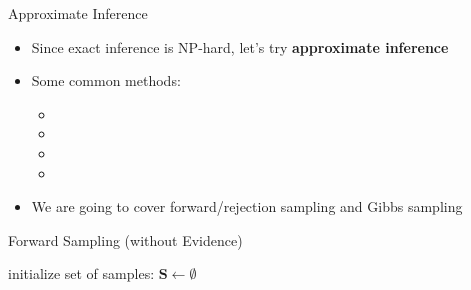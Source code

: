 \begin{frame}{Approximate Inference}{}
	\begin{itemize}
		\item Since exact inference is NP-hard, let's try \textbf{approximate inference}
		\item Some common methods:
		\begin{itemize}
			\item {}
			\item {}
			\item {}
			\item {}
		\end{itemize}
		\item We are going to cover forward/rejection sampling and Gibbs sampling
	\end{itemize}
\end{frame}


\begin{frame}{Forward Sampling (without Evidence)}{}
	\begin{algorithm}[H]
		\DontPrintSemicolon
		\footnotesize
		
		\;
		initialize set of samples: $\bm{S} \longleftarrow \emptyset$\;
		
 		\caption{Forward Sampling without Evidence}
	\end{algorithm}
\end{frame}


